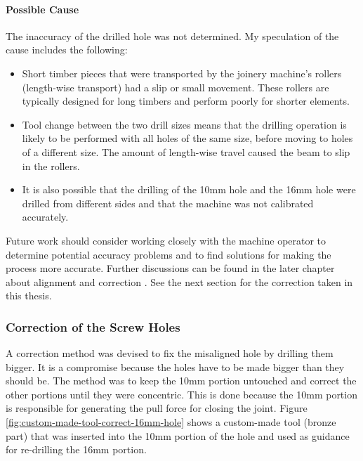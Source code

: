 \paragraph{Possible Cause}
The inaccuracy of the drilled hole was not determined. My speculation of the cause includes the following:
\begin{itemize}
    \item Short timber pieces that were transported by the joinery machine’s rollers (length-wise transport) had a slip or small movement. These rollers are typically designed for long timbers and perform poorly for shorter elements.
    \item Tool change between the two drill sizes means that the drilling operation is likely to be performed with all holes of the same size, before moving to holes of a different size. The amount of length-wise travel caused the beam to slip in the rollers.
    \item It is also possible that the drilling of the 10mm hole and the 16mm hole were drilled from different sides and that the machine was not calibrated accurately.
\end{itemize}

Future work should consider working closely with the machine operator to determine potential accuracy problems and to find solutions for making the process more accurate. Further discussions can be found in the later chapter about alignment and correction .
See the next section for the correction taken in this thesis.

\subsubsection{Correction of the Screw Holes}
\label{subsubsection:exploration-4-correction-of-the-screw-holes}

A correction method was devised to fix the misaligned hole by drilling them bigger. It is a compromise because the holes have to be made bigger than they should be. 
The method was to keep the 10mm portion untouched and correct the other portions until they were concentric. This is done because the 10mm portion is responsible for generating the pull force for closing the joint. Figure \ref{fig:custom-made-tool-correct-16mm-hole} shows a custom-made tool (bronze part) that was inserted into the 10mm portion of the hole and used as guidance for re-drilling the 16mm portion.

